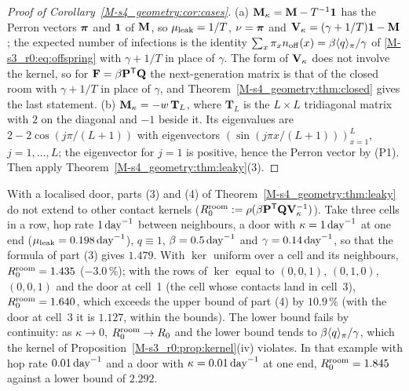 \begin{proof}[Proof of Corollary~\ref{M-s4_geometry:cor:cases}]
  (a) $\mathbf{M}_{\kappa}=\mathbf{M}-T^{-1}\mathbf{1}$ has the Perron vectors $\boldsymbol{\pi}$ and $\boldsymbol{1}$ of $\mathbf{M}$, so $\mu_{\mathrm{leak}}=1/T$, $\nu=\boldsymbol{\pi}$ and
  $\mathbf{V}_\kappa=(\gamma+1/T)\mathbf{1}-\mathbf{M}$; the expected number of infections is the identity
  $\sum_x\pi_xn_{\mathrm{off}}(x)=\beta\langle q\rangle_{\pi}/\gamma$ of \eqref{M-s3_r0:eq:offspring} with $\gamma+1/T$ in place of
  $\gamma$. The form of $\mathbf{V}_\kappa$ does not involve the kernel, so for $\mathbf{F}=\beta\mathbf{P}^{\mathsf{T}}\mathbf{Q}$ the next-generation
  matrix is that of the closed room with $\gamma+1/T$ in place of $\gamma$, and Theorem~\ref{M-s4_geometry:thm:closed}
  gives the last statement. (b) $\mathbf{M}_{\kappa}=-w\,\mathbf{T}_L$, where
  $\mathbf{T}_L$ is the $L\times L$ tridiagonal matrix with $2$ on the diagonal and $-1$ beside it. Its
  eigenvalues are $2-2\cos(j\pi/(L+1))$ with eigenvectors $(\sin(j\pi x/(L+1)))_{x=1}^{L}$, $j=1,\dots,L$; the
  eigenvector for $j=1$ is positive, hence the Perron vector by (P1). Then apply
  Theorem~\ref{M-s4_geometry:thm:leaky}(3).
\end{proof}

\begin{remark}\label{s4_geometry:rem:kernels}
  With a localised door, parts (3) and (4) of Theorem~\ref{M-s4_geometry:thm:leaky} do not extend to other
  contact kernels ($R_0^{\mathrm{room}}:=\rho(\beta\mathbf{P}^{\mathsf{T}}\mathbf{Q}\mathbf{V}_\kappa^{-1})$). Take three cells in a row, hop rate
  $1\,\mathrm{day}^{-1}$ between neighbours, a door with $\kappa=1\,\mathrm{day}^{-1}$ at one end ($\mu_{\mathrm{leak}}=0.198\,\mathrm{day}^{-1}$), $q\equiv1$,
  $\beta=0.5\,\mathrm{day}^{-1}$ and $\gamma=0.14\,\mathrm{day}^{-1}$, so that the formula of part (3) gives $1.479$. With $\ker$ uniform
  over a cell and its neighbours, $R_0^{\mathrm{room}}=1.435$ ($-3.0\,\%$); with the rows of $\ker$ equal to $(0,0,1)$,
  $(0,1,0)$, $(0,0,1)$ and the door at cell~1 (the cell whose contacts land in cell~3), $R_0^{\mathrm{room}}=1.640$, which
exceeds the upper bound of part (4) by $10.9\,\%$ (with the door at cell~3 it is $1.127$, within the bounds). The lower bound
  fails by continuity: as $\kappa\to0$, $R_0^{\mathrm{room}}\to R_0$ and the lower bound tends to $\beta\langle q\rangle_{\pi}/\gamma$,
  which the kernel of Proposition~\ref{M-s3_r0:prop:kernel}(iv) violates. In that example with hop rate
  $0.01\,\mathrm{day}^{-1}$ and a door with $\kappa=0.01\,\mathrm{day}^{-1}$ at one end, $R_0^{\mathrm{room}}=1.845$ against a lower bound of $2.292$.
\end{remark}


